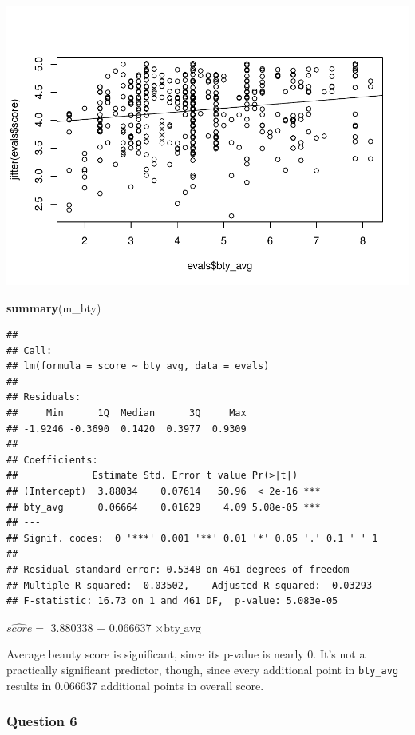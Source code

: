 \documentclass[]{article}
\newenvironment{Shaded}{\begin{snugshade}}{\end{snugshade}}
\newcommand{\KeywordTok}[1]{\textcolor[rgb]{0.13,0.29,0.53}{\textbf{#1}}}
\newcommand{\NormalTok}[1]{#1}
\begin{document}
\includegraphics{multiple_regression_files/figure-latex/quest-5-1.pdf}

\begin{Shaded}
\begin{Highlighting}[]
\KeywordTok{summary}\NormalTok{(m_bty)}
\end{Highlighting}
\end{Shaded}

\begin{verbatim}
## 
## Call:
## lm(formula = score ~ bty_avg, data = evals)
## 
## Residuals:
##     Min      1Q  Median      3Q     Max 
## -1.9246 -0.3690  0.1420  0.3977  0.9309 
## 
## Coefficients:
##             Estimate Std. Error t value Pr(>|t|)    
## (Intercept)  3.88034    0.07614   50.96  < 2e-16 ***
## bty_avg      0.06664    0.01629    4.09 5.08e-05 ***
## ---
## Signif. codes:  0 '***' 0.001 '**' 0.01 '*' 0.05 '.' 0.1 ' ' 1
## 
## Residual standard error: 0.5348 on 461 degrees of freedom
## Multiple R-squared:  0.03502,    Adjusted R-squared:  0.03293 
## F-statistic: 16.73 on 1 and 461 DF,  p-value: 5.083e-05
\end{verbatim}

\(\widehat{score} =\) 3.880338 + 0.066637 \(\times \text{bty_avg}\)

Average beauty score is significant, since its p-value is nearly 0. It's
not a practically significant predictor, though, since every additional
point in \texttt{bty\_avg} results in 0.066637 additional points in
overall score.

\subsubsection{Question 6}\label{question-6}
\end{document}
